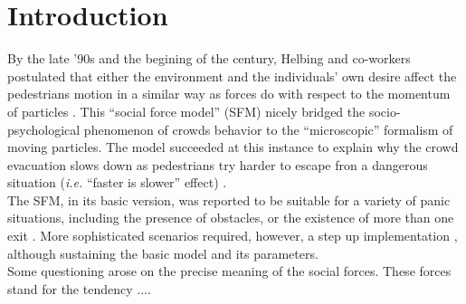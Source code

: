 \section{\label{introduction}Introduction}

By the late '90s and the begining of the century, Helbing and co-workers 
postulated that either the environment and the individuals' own desire affect 
the pedestrians motion in a similar way as forces do with respect to the 
momentum of particles \cite{Helbing1,Helbing4}. This ``social force model'' 
(SFM) nicely bridged the socio-psychological phenomenon of crowds 
behavior to the ``microscopic'' formalism of moving particles. The model 
succeeded at this instance to explain why the crowd evacuation slows down 
as pedestrians try harder to escape fron a dangerous situation 
(\textit{i.e.} ``faster is slower'' effect) \cite{Helbing1,Dorso1,Dorso2}. 
  \\ 

The SFM, in its basic version, was reported to be suitable for a variety of 
panic situations, including the presence of obstacles, or the existence of more 
than one exit \cite{Dorso3,Dorso5}. More sophisticated scenarios required, 
however, a step up implementation \cite{Dorso4,Dorso6,Cornes1}, although 
sustaining the basic model and its parameters.  \\

Some questioning arose on the precise meaning of the social forces. These 
forces stand for the tendency .... \\

